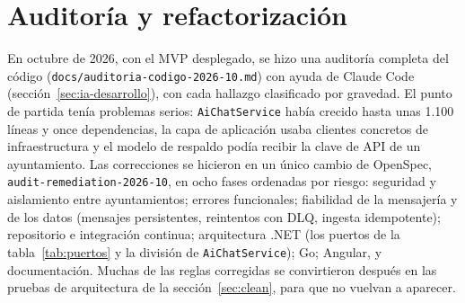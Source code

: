 \section{Auditoría y refactorización}
\label{sec:impl-auditoria}

En octubre de 2026, con el MVP desplegado, se hizo una auditoría completa del código (\texttt{docs/auditoria-codigo-2026-10.md}) con ayuda de Claude Code (sección~\ref{sec:ia-desarrollo}), con cada hallazgo clasificado por gravedad. El punto de partida tenía problemas serios: \texttt{AiChatService} había crecido hasta unas 1.100 líneas y once dependencias, la capa de aplicación usaba clientes concretos de infraestructura y el modelo de respaldo podía recibir la clave de API de un ayuntamiento. Las correcciones se hicieron en un único cambio de OpenSpec, \texttt{audit-remediation-2026-10}, en ocho fases ordenadas por riesgo: seguridad y aislamiento entre ayuntamientos; errores funcionales; fiabilidad de la mensajería y de los datos (mensajes persistentes, reintentos con DLQ, ingesta idempotente); repositorio e integración continua; arquitectura .NET (los puertos de la tabla~\ref{tab:puertos} y la división de \texttt{AiChatService}); Go; Angular, y documentación. Muchas de las reglas corregidas se convirtieron después en las pruebas de arquitectura de la sección~\ref{sec:clean}, para que no vuelvan a aparecer.
